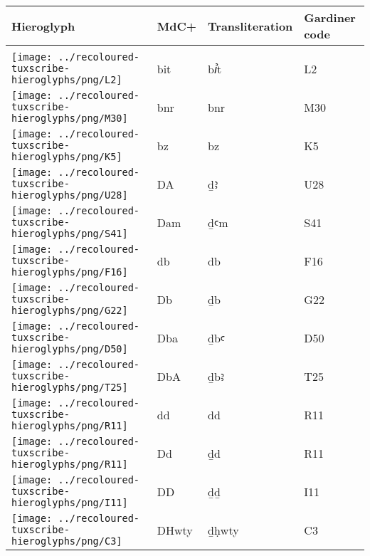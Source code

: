 \begin{center}
	\begin{tabularx}{\linewidth}{YYYY}
		Hieroglyph & MdC+ & Transliteration & Gardiner code\\
		\hline\\
		\texttt{[image: ../recoloured-tuxscribe-hieroglyphs/png/L2]} & bit & bꞽt & L2 \\ 
		\texttt{[image: ../recoloured-tuxscribe-hieroglyphs/png/M30]} & bnr & bnr & M30 \\ 
		\texttt{[image: ../recoloured-tuxscribe-hieroglyphs/png/K5]} & bz & bz & K5 \\ 
		\texttt{[image: ../recoloured-tuxscribe-hieroglyphs/png/U28]} & DA & ḏꜣ & U28 \\ 
		\texttt{[image: ../recoloured-tuxscribe-hieroglyphs/png/S41]} & Dam & ḏꜥm & S41 \\ 
		\texttt{[image: ../recoloured-tuxscribe-hieroglyphs/png/F16]} & db & db & F16 \\ 
		\texttt{[image: ../recoloured-tuxscribe-hieroglyphs/png/G22]} & Db & ḏb & G22 \\ 
		\texttt{[image: ../recoloured-tuxscribe-hieroglyphs/png/D50]} & Dba & ḏbꜥ & D50 \\ 
		\texttt{[image: ../recoloured-tuxscribe-hieroglyphs/png/T25]} & DbA & ḏbꜣ & T25 \\ 
		\texttt{[image: ../recoloured-tuxscribe-hieroglyphs/png/R11]} & dd & dd & R11 \\ 
		\texttt{[image: ../recoloured-tuxscribe-hieroglyphs/png/R11]} & Dd & ḏd & R11 \\ 
		\texttt{[image: ../recoloured-tuxscribe-hieroglyphs/png/I11]} & DD & ḏḏ & I11 \\ 
		\texttt{[image: ../recoloured-tuxscribe-hieroglyphs/png/C3]} & DHwty & ḏḥwty & C3 \\ 
	\end{tabularx}
\end{center}


